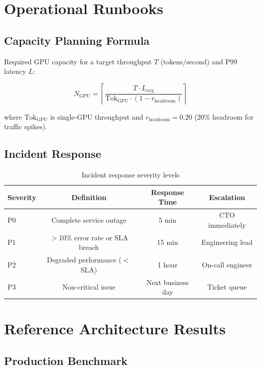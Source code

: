 \documentclass[11pt,a4paper]{article}
\begin{document}
\section{Operational Runbooks}

\subsection{Capacity Planning Formula}

Required GPU capacity for a target throughput $T$ (tokens/second) and P99 latency $L$:

\begin{equation}
N_{\text{GPU}} = \left\lceil \frac{T \cdot L_{\text{avg}}}{\text{Tok}_{\text{GPU}} \cdot (1 - r_{\text{headroom}})} \right\rceil
\end{equation}

where $\text{Tok}_{\text{GPU}}$ is single-GPU throughput and $r_{\text{headroom}} = 0.20$ (20\% headroom for traffic spikes).

\subsection{Incident Response}

\begin{table}[H]
\centering
\caption{Incident response severity levels}
\label{tab:incident}
\begin{tabular}{lccc}
\toprule
Severity & Definition & Response Time & Escalation \\
\midrule
P0 & Complete service outage & 5 min & CTO immediately \\
P1 & $>$10\% error rate or SLA breach & 15 min & Engineering lead \\
P2 & Degraded performance ($<$SLA) & 1 hour & On-call engineer \\
P3 & Non-critical issue & Next business day & Ticket queue \\
\bottomrule
\end{tabular}
\end{table}

\section{Reference Architecture Results}

\subsection{Production Benchmark}
\end{document}
